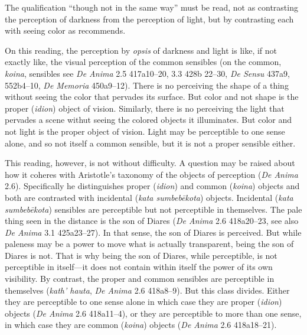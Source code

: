 The qualification ``though not in the same way'' must be read, not as contrasting the perception of darkness from the perception of light, but by contrasting each with seeing color as \citet[275]{Ross:1961uq} recommends.

On this reading, the perception by \emph{opsis} of darkness and light is like, if not exactly like, the visual perception of the common sensibles (on the common, \emph{koina}, sensibles see \emph{De Anima} 2.5 417a10–20, 3.3 428b 22–30, \emph{De Sensu} 437a9, 552b4–10, \emph{De Memoria} 450a9–12). There is no perceiving the shape of a thing without seeing the color that pervades its surface. But color and not shape is the proper (\emph{idion}) object of vision. Similarly, there is no perceiving the light that pervades a scene withut seeing the colored objects it illuminates. But color and not light is the proper object of vision. Light may be perceptible to one sense alone, and so not itself a common sensible, but it is not a proper sensible either.


This reading, however, is not without difficulty. A question may be raised about how it coheres with Aristotle's taxonomy of the objects of perception (\emph{De Anima} 2.6). Specifically he distinguishes proper (\emph{idion}) and common (\emph{koina}) objects and both are contrasted with incidental (\emph{kata sumbebēkota}) objects. Incidental (\emph{kata sumbebēkota}) sensibles are perceptible but not perceptible in themselves. The pale thing seen in the distance is the son of Diares (\emph{De Anima} 2.6 418a20–23, see also \emph{De Anima} 3.1 425a23–27). In that sense, the son of Diares is perceived. But while paleness may be a power to move what is actually transparent, being the son of Diares is not. That is why being the son of Diares, while perceptible, is not perceptible in itself—it does not contain within itself the power of its own visibility. By contrast, the proper and common sensibles are perceptible in themselves (\emph{kath' hauta}, \emph{De Anima} 2.6 418a8–9). But this class divides. Either they are perceptible to one sense alone in which case they are proper (\emph{idion}) objects (\emph{De Anima} 2.6 418a11–4), or they are perceptible to more than one sense, in which case they are common (\emph{koina}) objects (\emph{De Anima} 2.6 418a18–21).


